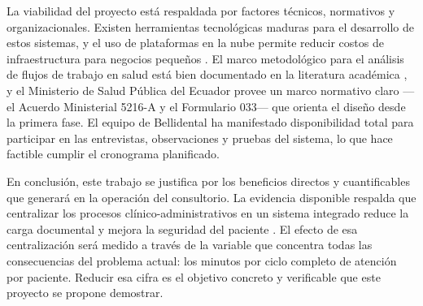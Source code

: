 La viabilidad del proyecto está respaldada por factores técnicos,
normativos y organizacionales. Existen herramientas tecnológicas maduras
para el desarrollo de estos sistemas, y el uso de plataformas en la nube
permite reducir costos de infraestructura para negocios pequeños
\cite{Sravya2024EHRDentistry}. El marco metodológico para el análisis de
flujos de trabajo en salud está bien documentado en la literatura académica
\cite{makerere2024business}, y el Ministerio de Salud Pública del Ecuador
provee un marco normativo claro —el Acuerdo Ministerial 5216-A y el
Formulario 033— que orienta el diseño desde la primera fase. El equipo
de Bellidental ha manifestado disponibilidad total para participar en las
entrevistas, observaciones y pruebas del sistema, lo que hace factible
cumplir el cronograma planificado.

En conclusión, este trabajo se justifica por los beneficios directos y
cuantificables que generará en la operación del consultorio. La evidencia
disponible respalda que centralizar los procesos clínico-administrativos
en un sistema integrado reduce la carga documental y mejora la seguridad
del paciente \cite{Sravya2024EHRDentistry}. El efecto de esa centralización
será medido a través de la variable que concentra todas las consecuencias
del problema actual: los minutos por ciclo completo de atención por
paciente. Reducir esa cifra es el objetivo concreto y verificable que
este proyecto se propone demostrar.